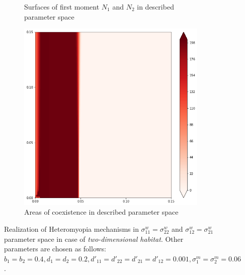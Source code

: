 \begin{figure}[ht]
\begin{subfigure}{.5\textwidth}
	\caption{Surfaces of first moment \(N_1\) and \(N_2\) in described parameter space}
	\label{fig:hmd2:sub3}
\end{subfigure}%
\begin{subfigure}{.5\textwidth}
	\centering
	\includegraphics[width=.93\linewidth]{hm_d2_n2.png}
	\caption{Areas of coexistence in described parameter space}
	\label{fig:hmd2:sub4}
\end{subfigure}
	\caption{Realization of Heteromyopia mechanisms in  $\sigma_{11}^{w}=\sigma_{22}^{w}$ and $\sigma_{12}^{w}=\sigma_{21}^{w}$ parameter space in case of \emph{two-dimensional habitat}. Other parameters are chosen as follows: $b_{1}=b_{2}=0.4
		, d_{1}=d_{2}=0.2
		, d'_{11}=d'_{22}=d'_{21}=d'_{12}=0.001,
		\sigma_{1}^{m}=\sigma_{2}^{m}=0.06$. }
	\label{fig:hmd2}
\end{figure}

